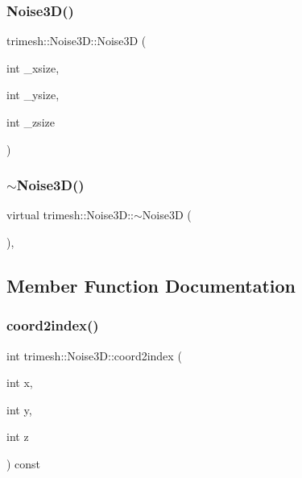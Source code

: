 \subsubsection{\texorpdfstring{Noise3\+D()}{Noise3D()}}
{\footnotesize\ttfamily trimesh\+::\+Noise3\+D\+::\+Noise3D (\begin{DoxyParamCaption}\item[{int}]{\+\_\+xsize,  }\item[{int}]{\+\_\+ysize,  }\item[{int}]{\+\_\+zsize }\end{DoxyParamCaption})\hspace{0.3cm}{\ttfamily [inline]}}

\mbox{\label{classtrimesh_1_1Noise3D_aef78d10b7449d4f3ec2f42d2b339e1cb}} 
\subsubsection{\texorpdfstring{$\sim$\+Noise3\+D()}{~Noise3D()}}
{\footnotesize\ttfamily virtual trimesh\+::\+Noise3\+D\+::$\sim$\+Noise3D (\begin{DoxyParamCaption}{ }\end{DoxyParamCaption})\hspace{0.3cm}{\ttfamily [inline]}, {\ttfamily [virtual]}}



\subsection{Member Function Documentation}
\mbox{\label{classtrimesh_1_1Noise3D_ad6ad1c6b70d61c7287aeeaaf62776289}} 
\subsubsection{\texorpdfstring{coord2index()}{coord2index()}}
{\footnotesize\ttfamily int trimesh\+::\+Noise3\+D\+::coord2index (\begin{DoxyParamCaption}\item[{int}]{x,  }\item[{int}]{y,  }\item[{int}]{z }\end{DoxyParamCaption}) const\hspace{0.3cm}{\ttfamily [inline]}}



